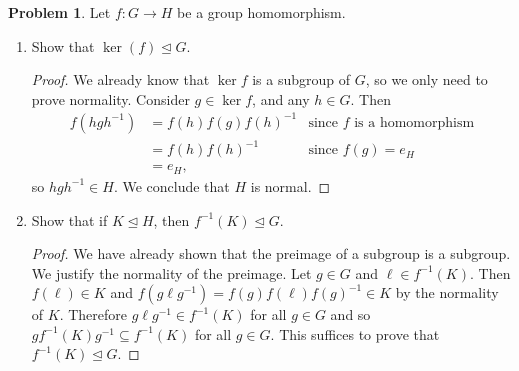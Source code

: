 \documentclass[11pt]{article}
\newcommand{\norm}{\trianglelefteq}
\theoremstyle{definition}
\newtheorem{problem}{Problem}
\begin{document}
\begin{problem} Let $f: G\to H$ be a group homomorphism.
\begin{enumerate}[(4.1)]
\item Show that $\ker(f) \trianglelefteq G$.


\begin{proof}
	We already know that $\ker f$ is a subgroup of $G$, so we only need to prove normality. Consider $g \in \ker f$, and any $h \in G$. Then
	$$\begin{aligned}
	f(hgh^{-1}) & = f(h)f(g)f(h)^{-1} & \textrm{since } f \textrm{ is a homomorphism} \\
	& = f(h)f(h)^{-1} & \textrm{since } f(g) = e_H \\
	& = e_H,
	\end{aligned}$$
	so $hgh^{-1} \in H$. We conclude that $H$ is normal.
\end{proof}

\item Show that if $K \trianglelefteq H$, then $f^{-1}(K) \trianglelefteq G$.


\begin{proof}
We have already shown that the preimage of a subgroup is a subgroup. We justify the normality of the preimage.
Let $g\in G$ and $\ell\in f^{-1}(K)$. Then $f(\ell)\in K$ and $f(g\ell g^{-1})=f(g)f(\ell)f(g)^{-1}\in K$ by the normality of $K$. Therefore $g\ell g^{-1}\in  f^{-1}(K)$ for all $g\in G$ and so  $gf^{-1}(K)g^{-1}\subseteq  f^{-1}(K)$ for all $g\in G$. This suffices to prove that  $f^{-1}(K)\norm G$.
\end{proof}

\end{enumerate}
\end{problem}

\smallskip
\end{document}
